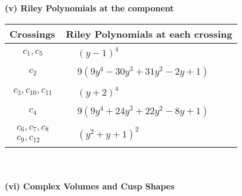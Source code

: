 \documentclass[1p]{elsarticle_modified}
\theoremstyle{definition}
\begin{document}
\newpage\renewcommand{\arraystretch}{1}
\flushleft \textbf{(v) Riley Polynomials at the component}\newline \\
\begin{tabular}{m{50pt}|m{274pt}}
Crossings & \hspace{64pt}Riley Polynomials at each crossing \\
\hline $$\begin{aligned}c_{1},c_{5}\end{aligned}$$&$\begin{aligned}
&(y-1)^4
\end{aligned}$\\
\hline $$\begin{aligned}c_{2}\end{aligned}$$&$\begin{aligned}
&9(9 y^4-30 y^3+31 y^2-2 y+1)
\end{aligned}$\\
\hline $$\begin{aligned}c_{3},c_{10},c_{11}\end{aligned}$$&$\begin{aligned}
&(y+2)^4
\end{aligned}$\\
\hline $$\begin{aligned}c_{4}\end{aligned}$$&$\begin{aligned}
&9(9 y^4+24 y^3+22 y^2-8 y+1)
\end{aligned}$\\
\hline $$\begin{aligned}c_{6},c_{7},c_{8}\\c_{9},c_{12}\end{aligned}$$&$\begin{aligned}
&(y^2+y+1)^2
\end{aligned}$\\
\hline
\end{tabular}\\~\\
\newpage\flushleft \textbf{(vi) Complex Volumes and Cusp Shapes}
\end{document}

